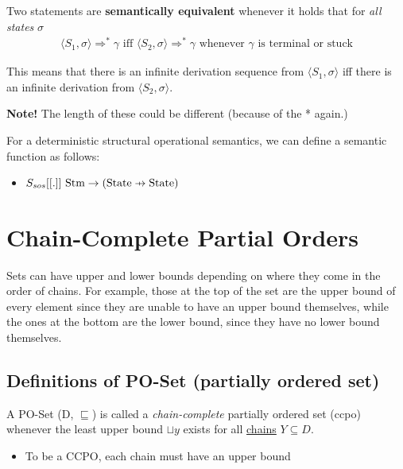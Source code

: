 \documentclass[11pt,a4paper,titlepage,dvipsnames,cmyk]{scrartcl}
\newcommand\pfun{\mathrel{\ooalign{\hfil$\mapstochar\mkern5mu$\hfil\cr$\to$\cr}}}
\begin{document}
Two statements are \textbf{semantically equivalent} whenever it holds that
for \textit{all states} $\sigma$
\begin{align*}
    \langle S_1, \sigma \rangle \Rightarrow^* \gamma \text{ iff } \langle
    S_2, \sigma \rangle
    \Rightarrow^* \gamma \text{ whenever } \gamma \text{ is terminal or
stuck} 
\end{align*}

This means that there is an infinite derivation sequence from $\langle S_1,
\sigma \rangle$ iff there is an infinite derivation from $\langle S_2,
\sigma \rangle$.

\textbf{Note!} The length of these could be different (because of the *
again.)

For a deterministic structural operational semantics, we can define a
semantic function as follows:
\begin{itemize}
    \item $S_{sos} [[.]] \text{ Stm} \rightarrow (\text{State} \pfun
        \text{State})$
\end{itemize}




\section{Chain-Complete Partial Orders}%
\label{sec:ccpo}

Sets can have upper and lower bounds depending on where they come in the
order of chains. For example, those at the top of the set are the upper
bound of every element since they are unable to have an upper bound
themselves, while the ones at the bottom are the lower bound, since they
have no lower bound themselves.

\subsection{Definitions of PO-Set (partially ordered set)}%
\label{sub:Definitions of PO-Set}
A PO-Set (D, $\sqsubseteq$) is called a \textit{chain-complete} partially
ordered set (ccpo) whenever the least upper bound $\sqcup y$ exists for
all \underline{chains} $Y \subseteq D$.
\begin{itemize}
    \item To be a CCPO, each chain must have an upper bound
\end{itemize}
\end{document}

